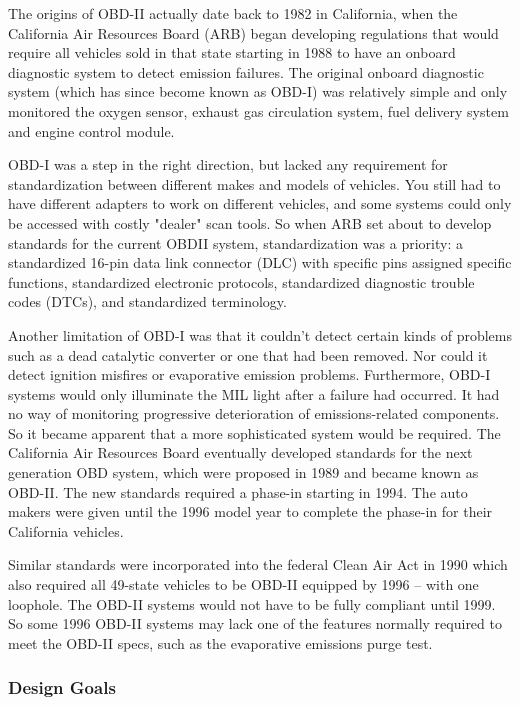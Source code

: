 \begin{displayquote}
	The origins of OBD-II actually date back to 1982 in California, when the California Air Resources Board (ARB) began developing regulations that would require all vehicles sold in that state starting in 1988 to have an onboard diagnostic system to detect emission failures. The original onboard diagnostic system (which has since become known as OBD-I) was relatively simple and only monitored the oxygen sensor, exhaust gas circulation system, fuel delivery system and engine control module.
	
	OBD-I was a step in the right direction, but lacked any requirement for standardization between different makes and models of vehicles. You still had to have different adapters to work on different vehicles, and some systems could only be accessed with costly "dealer" scan tools. So when ARB set about to develop standards for the current OBDII system, standardization was a priority: a standardized 16-pin data link connector (DLC) with specific pins assigned specific functions, standardized electronic protocols, standardized diagnostic trouble codes (DTCs), and standardized terminology.
	
	Another limitation of OBD-I was that it couldn't detect certain kinds of problems such as a dead catalytic converter or one that had been removed. Nor could it detect ignition misfires or evaporative emission problems. Furthermore, OBD-I systems would only illuminate the MIL light after a failure had occurred. It had no way of monitoring progressive deterioration of emissions-related components. So it became apparent that a more sophisticated system would be required. The California Air Resources Board eventually developed standards for the next generation OBD system, which were proposed in 1989 and became known as OBD-II. The new standards required a phase-in starting in 1994. The auto makers were given until the 1996 model year to complete the phase-in for their California vehicles.
	
	Similar standards were incorporated into the federal Clean Air Act in 1990 which also required all 49-state vehicles to be OBD-II equipped by 1996 -- with one loophole. The OBD-II systems would not have to be fully compliant until 1999. So some 1996 OBD-II systems may lack one of the features normally required to meet the OBD-II specs, such as the evaporative emissions purge test.
\end{displayquote}

\subsubsection{Design Goals} 
\label{subsec:obd:design_goal}

